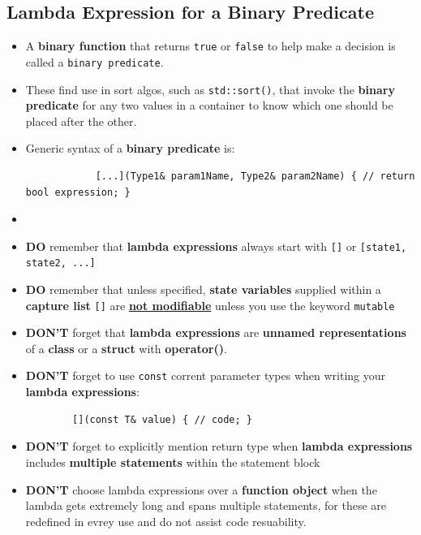 \documentclass[10pt]{article}
\newcommand{\pbreak}{\vspace{30pt}}
\begin{document}
\newpage

\subsection{Lambda Expression for a Binary Predicate}
\begin{itemize}
	\item A \textbf{binary function} that returns \verb|true| or \verb|false| to help make a decision is called a \verb|binary predicate|.

	\item These \textbf{} find use in sort algos, such as \verb|std::sort()|, that invoke the \textbf{binary predicate} for any two values in a container to know which one should be placed after the other.

	\item Generic syntax of a \textbf{binary predicate} is:
		\begin{verbatim}
			[...](Type1& param1Name, Type2& param2Name) { // return bool expression; }
		\end{verbatim}

	\item {}
\end{itemize}

\newpage

\begin{itemize}
	\item \textbf{DO} remember that \textbf{lambda expressions} always start with \verb|[]| or \verb|[state1, state2, ...]|
	\item \textbf{DO} remember that unless specified, \textbf{state variables} supplied within a \textbf{capture list} \verb|[]| are \textbf{\underline{not modifiable}} unless you use the keyword \verb|mutable|

	\pbreak

\item \textbf{DON'T} forget that \textbf{lambda expressions} are \textbf{unnamed representations} of a \textbf{class} or a \textbf{struct} with \textbf{operator()}.
\item \textbf{DON'T} forget to use \verb|const| corrent parameter types when writing your \textbf{lambda expressions}:
	\begin{verbatim}
		[](const T& value) { // code; }
	\end{verbatim}
\item \textbf{DON'T} forget to explicitly mention return type when \textbf{lambda expressions} includes \textbf{multiple statements} within the statement block {}
\item \textbf{DON'T} choose lambda expressions over a \textbf{function object} when the lambda gets extremely long and spans multiple statements, for these are redefined in evrey use and do not assist code resuability.
\end{itemize}
\end{document}
